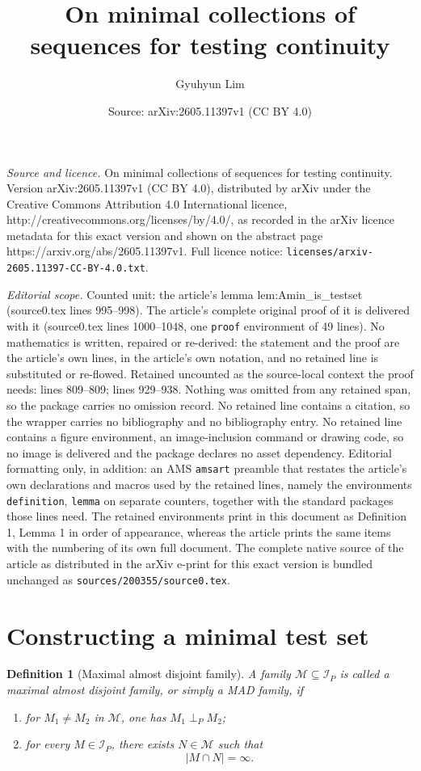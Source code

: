 \documentclass[10pt,a4paper]{amsart}
\title{On minimal collections of sequences for testing continuity}
\author{Gyuhyun Lim}
\date{Source: arXiv:2605.11397v1 (CC BY 4.0)}
\newtheorem{definition}{Definition}
\begin{document}
\maketitle

\noindent\emph{Source and licence.} On minimal collections of sequences for testing continuity. Version arXiv:2605.11397v1 (CC BY 4.0), distributed by arXiv under the Creative Commons Attribution 4.0 International licence, http://creativecommons.org/licenses/by/4.0/, as recorded in the arXiv licence metadata for this exact version and shown on the abstract page https://arxiv.org/abs/2605.11397v1. Full licence notice: \texttt{licenses/arxiv-2605.11397-CC-BY-4.0.txt}.\par\smallskip

\noindent\textit{Editorial scope.} Counted unit: the article's lemma lem:Amin\_is\_testset (source0.tex lines 995--998). The article's complete original proof of it is delivered with it (source0.tex lines 1000--1048, one \texttt{proof} environment of 49 lines). No mathematics is written, repaired or re-derived: the statement and the proof are the article's own lines, in the article's own notation, and no retained line is substituted or re-flowed.  Retained uncounted as the source-local context the proof needs: lines 809--809; lines 929--938.  Nothing was omitted from any retained span, so the package carries no omission record.  No retained line contains a citation, so the wrapper carries no bibliography and no bibliography entry.  No retained line contains a figure environment, an image-inclusion command or drawing code, so no image is delivered and the package declares no asset dependency.  Editorial formatting only, in addition: an AMS \texttt{amsart} preamble that restates the article's own declarations and macros used by the retained lines, namely the environments \texttt{definition}, \texttt{lemma} on separate counters, together with the standard packages those lines need.  The retained environments print in this document as Definition 1, Lemma 1 in order of appearance, whereas the article prints the same items with the numbering of its own full document.  The complete native source of the article as distributed in the arXiv e-print for this exact version is bundled unchanged as \texttt{sources/200355/source0.tex}.
\section{Constructing a minimal test set}\label{sec:minimal}

\begin{definition}[Maximal almost disjoint family]\label{def:MAD}
A family $\mathcal M\subseteq\mathcal I_P$ is called a \emph{maximal almost disjoint family}, or simply a \emph{MAD family}, if
\begin{enumerate}[label=(\roman*)]
\item for $M_1\neq M_2$ in $\mathcal M$, one has $M_1\perp_P M_2$;
\item for every $M\in\mathcal I_P$, there exists $N\in\mathcal M$ such that
\[
|M\cap N|=\infty.
\]
\end{enumerate}
\end{definition}
\end{document}
